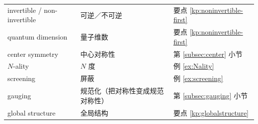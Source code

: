 \documentclass[UTF8,a4paper,11pt]{ctexart}
\theoremstyle{plain}
\theoremstyle{definition}
\theoremstyle{remark}
\begin{document}
\begin{table}[htbp]
\begin{tabular}{@{}lll@{}}
invertible / non-invertible & 可逆／不可逆 & 要点 \ref{kp:noninvertible-first} \\
quantum dimension & 量子维数 & 要点 \ref{kp:noninvertible-first} \\
center symmetry & 中心对称性 & 第 \ref{subsec:center} 小节 \\
$N$-ality & $N$ 度 & 例 \ref{ex:Nality} \\
screening & 屏蔽 & 例 \ref{ex:screening} \\
gauging & 规范化（把对称性变成规范对称性） & 第 \ref{subsec:gauging} 小节 \\
global structure & 全局结构 & 要点 \ref{kp:globalstructure} \\
\bottomrule
\end{tabular}
\end{table}
\end{document}
